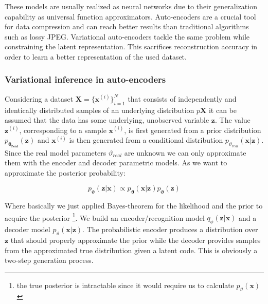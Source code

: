 \documentclass[12pt, english]{article}
\begin{document}
\vspace{4mm}

\par These models are usually realized as neural networks due to their generalization capability as universal function approximators. Auto-encoders are a crucial tool for data compression and can reach better results than traditional algorithms \cite{theis2017lossy} such as lossy JPEG. Variational auto-encoders tackle the same problem while constraining the latent representation. This sacrifices reconstruction accuracy in order to learn a better representation of the used dataset.

\vspace{4mm}

\subsubsection{Variational inference in auto-encoders}

\vspace{4mm}

\par Considering a dataset $\boldsymbol{X} = \big\{\boldsymbol{\bm{x}}^{(i)}\big\}_{i = 1}^{N}$ that consists of independently and identically distributed samples of an underlying distribution $p{\boldsymbol{X}}$ it can be assumed that the data has some underlying, unobserved variable $\boldsymbol{\bm{z}}$. The value $\boldsymbol{\bm{z}}^{(i)}$, corresponding to a sample $\boldsymbol{\bm{x}}^{(i)}$, is first generated from a prior distribution $p_{\boldsymbol{\vartheta_{real}}}(\boldsymbol{\bm{z}})$ and $\boldsymbol{\bm{x}}^{(i)}$ is then generated from a conditional distribution $p_{\vartheta_{real}}(\boldsymbol{\bm{x}} | \boldsymbol{\bm{z}})$. Since the real model parameters $\vartheta_{real}$ are unknown we can only approximate them with the encoder and decoder parametric models. As we want to approximate the posterior probability:

\vspace{4mm}

\begin{equation}
    p_{\boldsymbol{\vartheta}}(\boldsymbol{\bm{z}} | \boldsymbol{\bm{x}}) \propto p_{\boldsymbol{\vartheta}}(\boldsymbol{\bm{x}} | \boldsymbol{\bm{z}}) p_{\boldsymbol{\vartheta}}(\boldsymbol{\bm{z}})
\end{equation}

\vspace{4mm}

\par Where basically we just applied Bayes-theorem for the likelihood and the prior to acquire the posterior \footnote{the true posterior is intractable since it would require us to calculate $p_{\vartheta}(\bm{x})$}. We build an encoder/recognition model $q_{\phi}(\boldsymbol{\bm{z}} | \boldsymbol{\bm{x}})$ and a decoder model $p_{\vartheta}(\boldsymbol{\bm{x}} | \boldsymbol{\bm{z}})$. The probabilistic encoder produces a distribution over $\boldsymbol{\bm{z}}$ that should properly approximate the prior while the  decoder provides samples from the approximated true distribution given a latent code. This is obviously a two-step generation process. 
\end{document}
